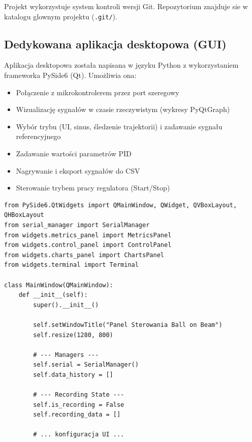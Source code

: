 \documentclass[11pt]{article}
\begin{document}
Projekt wykorzystuje system kontroli wersji Git. Repozytorium znajduje sie w katalogu glownym projektu (\texttt{.git/}).

\subsection{Dedykowana aplikacja desktopowa (GUI)}

Aplikacja desktopowa została napisana w języku Python z wykorzystaniem frameworka PySide6 (Qt). Umożliwia ona:
\begin{itemize}
    \item Połączenie z mikrokontrolerem przez port szeregowy
    \item Wizualizację sygnałów w czasie rzeczywistym (wykresy PyQtGraph)
    \item Wybór trybu (UI, sinus, śledzenie trajektorii) i zadawanie sygnału referencyjnego 
    \item Zadawanie wartości parametrów PID
    \item Nagrywanie i eksport sygnałów do CSV
    \item Sterowanie trybem pracy regulatora (Start/Stop)
\end{itemize}

\begin{lstlisting}[caption={Główna klasa aplikacji GUI (app.py)}, style=pythonstyle]
from PySide6.QtWidgets import QMainWindow, QWidget, QVBoxLayout, QHBoxLayout
from serial_manager import SerialManager
from widgets.metrics_panel import MetricsPanel
from widgets.control_panel import ControlPanel
from widgets.charts_panel import ChartsPanel
from widgets.terminal import Terminal

class MainWindow(QMainWindow):
    def __init__(self):
        super().__init__()
        
        self.setWindowTitle("Panel Sterowania Ball on Beam")
        self.resize(1280, 800)
        
        # --- Managers ---
        self.serial = SerialManager()
        self.data_history = []
        
        # --- Recording State ---
        self.is_recording = False
        self.recording_data = []
        
        # ... konfiguracja UI ...
\end{lstlisting}
\end{document}
